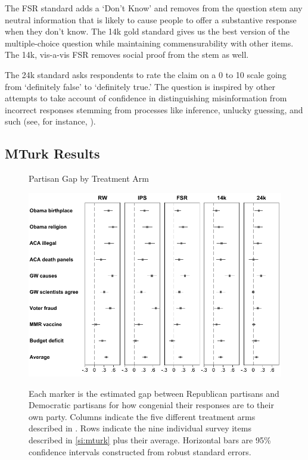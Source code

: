 \documentclass[12pt, letterpaper]{article}
\begin{document}
The FSR standard adds a `Don't Know’ and removes from the question stem any neutral information that is likely to cause people to offer a substantive response when they don't know. The 14k gold standard gives us the best version of the multiple-choice question while maintaining commensurability with other items. The 14k, vis-a-vis FSR removes social proof from the stem as well.

The 24k standard asks respondents to rate the claim on a 0 to 10 scale going from `definitely false' to `definitely true.' The question is inspired by other attempts to take account of confidence in distinguishing misinformation from incorrect responses stemming from processes like inference, unlucky guessing, and such (see, for instance, \citep{pasek2015}).

\subsection{MTurk Results}
\begin{center}
	\begin{figure}[H]
		\centering
		\caption{Partisan Gap by Treatment Arm}
		\includegraphics[scale=.8]{../figs/partisan-gap-by-item-arm.pdf}
		\label{fig:partisangaps-mturk}
		\caption*{\footnotesize 
			Each marker is the estimated gap between Republican partisans and Democratic partisans for how congenial their responses are to their own party.
			Columns indicate the five different treatment arms described in . Rows indicate the nine individual survey items described in \cref{si:mturk} plus their average.
			Horizontal bars are 95\% confidence intervals constructed from robust standard errors.
		}
	\end{figure}
\end{center}
\end{document}
